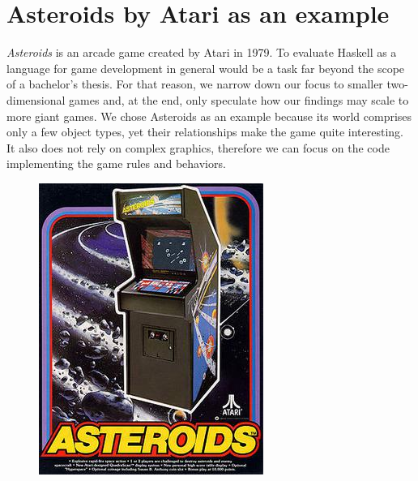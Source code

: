 \documentclass[
  digital, %
  color,   %
  table,   %
  oneside, %
  lof,     %
  lot,     %
]{fithesis3}
\begin{document}
\section{Asteroids by Atari as an example}
\label{sect:whyasteroids}
\emph{Asteroids} is an arcade game created by Atari in 1979.
To evaluate Haskell as a language for game development in general
would be a task far beyond the scope of a bachelor's thesis. For that reason,
we narrow down our focus to smaller two-dimensional games and, at the end,
only speculate how our findings may scale to more giant games.
We chose Asteroids as an example because its world comprises only
a few object types, yet their relationships make the game quite interesting.
It also does not rely on complex graphics, therefore we can focus
on the code implementing the game rules and behaviors.
\begin{figure}
    \begin{minipage}{0.33\textwidth}
        \includegraphics[height=1.3\textwidth]{images/Asteroids-arcadegame.jpg}\hfill

\end{minipage}
\end{figure}
\end{document}

